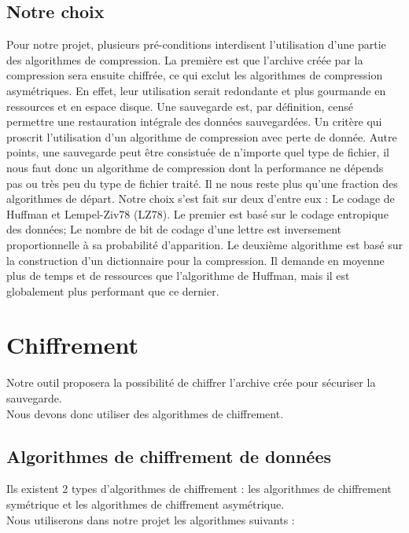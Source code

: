     \subsection{Notre choix}
        Pour notre projet, plusieurs pré-conditions interdisent l'utilisation d'une partie des algorithmes de compression. La première est que l'archive créée par la compression sera ensuite chiffrée, ce qui exclut les algorithmes de compression asymétriques. En effet, leur utilisation serait redondante et plus gourmande en ressources et en espace disque. Une sauvegarde est, par définition, censé permettre une restauration intégrale des données sauvegardées. Un critère qui proscrit l'utilisation d'un algorithme de compression avec perte de donnée. Autre points, une sauvegarde peut être consistuée de n'importe quel type de fichier, il nous faut donc un algorithme de compression dont la performance ne dépends pas ou très peu du type de fichier traité. Il ne nous reste plus qu'une fraction des algorithmes de départ.
        Notre choix s'est fait sur deux d'entre eux : Le codage de Huffman et Lempel-Ziv78 (LZ78). Le premier est basé sur le codage entropique des données; Le nombre de bit de codage d'une lettre est inversement proportionnelle à sa probabilité d'apparition. Le deuxième algorithme est basé sur la construction d'un dictionnaire pour la compression. Il demande en moyenne plus de temps et de ressources que l'algorithme de Huffman, mais il est globalement plus performant que ce dernier.
        
    
\newpage

\section{Chiffrement}
    
    Notre outil proposera la possibilité de chiffrer l’archive crée pour sécuriser la sauvegarde. \\
    Nous devons donc utiliser des algorithmes de chiffrement.

    \subsection*{Algorithmes de chiffrement de données}
        Ils existent 2 types d’algorithmes de chiffrement : les algorithmes de chiffrement symétrique et les algorithmes de chiffrement asymétrique. \\
        
        Nous utiliserons dans notre projet les algorithmes suivants : \\
        
